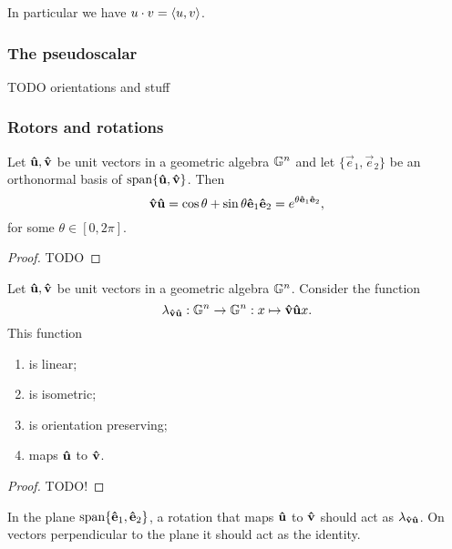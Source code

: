 In particular we have $u\cdot v = \inner{u,v}$.

\subsubsection{The pseudoscalar}
TODO orientations and stuff

\subsubsection{Rotors and rotations}
\begin{lemma}
Let $\vhat{u}, \vhat{v}$ be unit vectors in a geometric algebra $\G^n$ and let $\{\vec{e}_1, \vec{e}_2\}$ be an orthonormal basis of $\Span\{\vhat{u},\vhat{v}\}$. Then
\[ \vhat{v}\vhat{u} = \cos\theta + \sin\theta \vhat{e}_1\vhat{e}_2 = e^{\theta \vhat{e}_1\vhat{e}_2}, \]
for some $\theta \in [ 0,2\pi ]$.
\end{lemma}
\begin{proof}
TODO
\end{proof}

\begin{proposition}
Let $\vhat{u}, \vhat{v}$ be unit vectors in a geometric algebra $\G^n$. Consider the function 
\[ \lambda_{\vhat{v}\vhat{u}}: \G^n \to \G^n: x\mapsto \vhat{v}\vhat{u}x.\]
This function
\begin{enumerate}
\item is linear;
\item is isometric;
\item is orientation preserving;
\item maps $\vhat{u}$ to $\vhat{v}$.
\end{enumerate}
\end{proposition}
\begin{proof}
TODO!
\end{proof}

In the plane $\Span\{\vhat{e}_1,\vhat{e}_2\}$, a rotation that maps $\vhat{u}$ to $\vhat{v}$ should act as $\lambda_{\vhat{v}\vhat{u}}$. On vectors perpendicular to the plane it should act as the identity.


